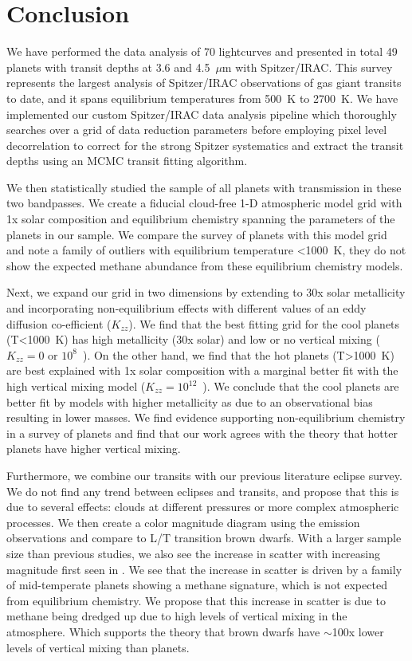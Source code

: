 \section{Conclusion}
\label{P1:sec:conclusion}

We have performed the data analysis of 70 lightcurves and presented in total 49 planets with transit depths at 3.6 and 4.5~$\mu$m with Spitzer/IRAC. This survey represents the largest analysis of Spitzer/IRAC observations of gas giant transits to date, and it spans equilibrium temperatures from 500~K to 2700~K. We have implemented our custom Spitzer/IRAC data analysis pipeline which thoroughly searches over a grid of data reduction parameters before employing pixel level decorrelation \citep{Deming2015} to correct for the strong Spitzer systematics and extract the transit depths using an MCMC transit fitting algorithm.

We then statistically studied the sample of all planets with transmission in these two bandpasses. We create a fiducial cloud-free 1-D atmospheric model grid with 1x solar composition and equilibrium chemistry spanning the parameters of the planets in our sample. We compare the survey of planets with this model grid and note a family of outliers with equilibrium temperature <1000~K, they do not show the expected methane abundance from these equilibrium chemistry models.

Next, we expand our grid in two dimensions by extending to 30x solar metallicity and incorporating non-equilibrium effects with different values of an eddy diffusion co-efficient ($K_{zz}$). We find that the best fitting grid for the cool planets (T<1000~K) has high metallicity (30x solar) and low or no vertical mixing ($K_{zz}=0$ or $10^8$~\cmcms). On the other hand, we find that the hot planets (T>1000~K) are best explained with 1x solar composition with a marginal better fit with the high vertical mixing model ($K_{zz}=10^{12}$~\cmcms). We conclude that the cool planets are better fit by models with higher metallicity as due to an observational bias resulting in lower masses. We find evidence supporting non-equilibrium chemistry in a survey of planets and find that our work agrees with the theory that hotter planets have higher vertical mixing.

Furthermore, we combine our transits with our previous literature eclipse survey. We do not find any trend between eclipses and transits, and propose that this is due to several effects: clouds at different pressures or more complex atmospheric processes. We then create a color magnitude diagram using the emission observations and compare to L/T transition brown dwarfs. With a larger sample size than previous studies, we also see the increase in scatter with increasing magnitude first seen in \citet{Triaud2014b}. We see that the increase in scatter is driven by a family of mid-temperate planets showing a methane signature, which is not expected from equilibrium chemistry. We propose that this increase in scatter is due to methane being dredged up due to high levels of vertical mixing in the atmosphere. Which supports the theory that brown dwarfs have $\sim$100x lower levels of vertical mixing than planets.

